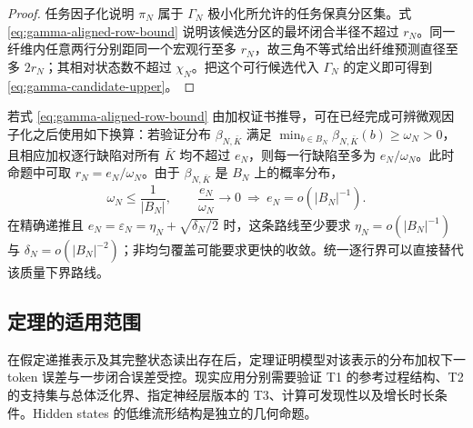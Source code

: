 \begin{proof}
任务因子化说明 $\pi_N$ 属于 $\Gamma_N$ 极小化所允许的任务保真分区集。式
\eqref{eq:gamma-aligned-row-bound} 说明该候选分区的最坏闭合半径不超过 $r_N$。同一纤维内任意两行分别距同一个宏观行至多 $r_N$，故三角不等式给出纤维预测直径至多 $2r_N$；其相对状态数不超过 $\chi_N$。把这个可行候选代入 $\Gamma_N$ 的定义即可得到
\eqref{eq:gamma-candidate-upper}。
\end{proof}

若式 \eqref{eq:gamma-aligned-row-bound} 由加权证书推导，可在已经完成可辨微观因子化之后使用如下换算：若验证分布
$\beta_{N,\bar K}$ 满足
$\min_{b\in B_N}\beta_{N,\bar K}(b)\ge\omega_N>0$，且相应加权逐行缺陷对所有 $\bar K$ 均不超过 $e_N$，则每一行缺陷至多为
$e_N/\omega_N$。此时命题中可取 $r_N=e_N/\omega_N$。由于 $\beta_{N,\bar K}$ 是 $B_N$ 上的概率分布，
\[
 \omega_N\le\frac1{|B_N|},
 \qquad
 \frac{e_N}{\omega_N}\to0
 \ \Longrightarrow\
 e_N=o(|B_N|^{-1}).
\]
在精确递推且 $e_N=\varepsilon_N=\eta_N+\sqrt{\delta_N/2}$ 时，这条路线至少要求
$\eta_N=o(|B_N|^{-1})$ 与 $\delta_N=o(|B_N|^{-2})$；非均匀覆盖可能要求更快的收敛。统一逐行界可以直接替代该质量下界路线。

\subsection{定理的适用范围}

在假定递推表示及其完整状态读出存在后，定理证明模型对该表示的分布加权下一 token 误差与一步闭合误差受控。现实应用分别需要验证 T1 的参考过程结构、T2 的支持集与总体泛化界、指定神经层版本的 T3、计算可发现性以及增长时长条件。Hidden states 的低维流形结构是独立的几何命题。
